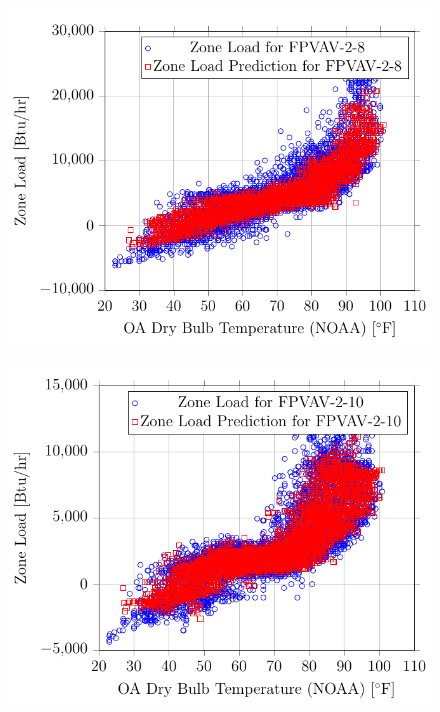 \begin{figure}
\centering
\includegraphics{Plots/19/2017-06-27-1330-BtuhrvsOADryBulbTemperatureNOAAF.pdf}
\caption{}
\label{fig:2017-06-27-1330-BtuhrvsOADryBulbTemperatureNOAAF}
\end{figure}

\begin{figure}
\centering
\includegraphics{Plots/20/2017-06-27-1332-BtuhrvsOADryBulbTemperatureNOAAF.pdf}
\caption{}
\label{fig:2017-06-27-1332-BtuhrvsOADryBulbTemperatureNOAAF}
\end{figure}

